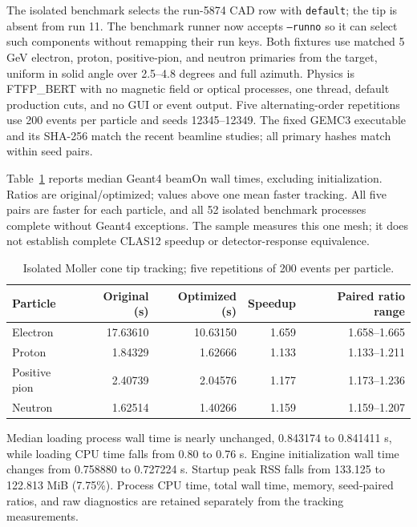 The isolated benchmark selects the run-5874 CAD row with \texttt{default}; the tip is absent from run 11. The
benchmark runner now accepts \texttt{--runno} so it can select such components without remapping their run
keys. Both fixtures use matched 5 GeV electron, proton, positive-pion, and neutron primaries from the target,
uniform in solid angle over 2.5--4.8 degrees and full azimuth. Physics is FTFP\_BERT with no magnetic field or
optical processes, one thread, default production cuts, and no GUI or event output. Five alternating-order
repetitions use 200 events per particle and seeds 12345--12349. The fixed GEMC3 executable and its SHA-256
match the recent beamline studies; all primary hashes match within seed pairs.

Table~\ref{tab:cone-tip-tracking} reports median Geant4 beamOn wall times, excluding initialization. Ratios
are original/optimized; values above one mean faster tracking. All five pairs are faster for each particle,
and all 52 isolated benchmark processes complete without Geant4 exceptions. The sample measures this one mesh;
it does not establish complete CLAS12 speedup or detector-response equivalence.

\begin{table}[htbp]
\centering
\caption{Isolated Moller cone tip tracking; five repetitions of 200 events per particle.}
\label{tab:cone-tip-tracking}
\setlength{\tabcolsep}{6pt}
\begin{tabular}{lrrrr}
\toprule
Particle & Original (s) & Optimized (s) & Speedup & Paired ratio range \\
\midrule
Electron & 17.63610 & 10.63150 & 1.659 & 1.658--1.665 \\
Proton & 1.84329 & 1.62666 & 1.133 & 1.133--1.211 \\
Positive pion & 2.40739 & 2.04576 & 1.177 & 1.173--1.236 \\
Neutron & 1.62514 & 1.40266 & 1.159 & 1.159--1.207 \\
\bottomrule
\end{tabular}
\end{table}

Median loading process wall time is nearly unchanged, 0.843174 to 0.841411 s, while loading CPU time falls
from 0.80 to 0.76 s. Engine initialization wall time changes from 0.758880 to 0.727224 s. Startup peak RSS
falls from 133.125 to 122.813 MiB (7.75\%). Process CPU time, total wall time, memory, seed-paired ratios, and
raw diagnostics are retained separately from the tracking measurements.

